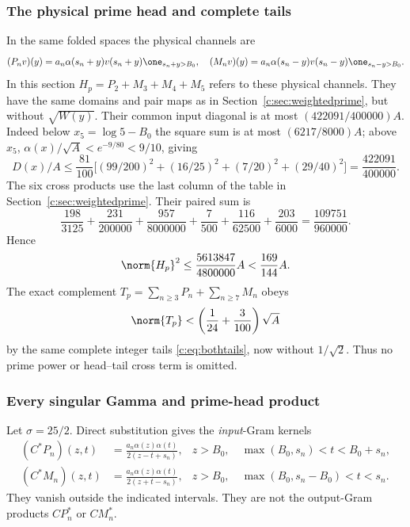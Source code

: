 \documentclass[11pt,a4paper]{article}
\numberwithin{equation}{section}
\theoremstyle{definition}\newtheorem{definition}[theorem]{Definition}
\theoremstyle{remark}\newtheorem{remark}[theorem]{Remark}
\begin{document}
\subsubsection{The physical prime head and complete tails}
In the same folded spaces the physical channels are
\[
 (P_nv)(y)=a_n\alpha(s_n+y)v(s_n+y)\one_{s_n+y>{B_0}},\quad
 (M_nv)(y)=a_n\alpha(s_n-y)v(s_n-y)\one_{s_n-y>{B_0}}.
\]
In this section $H_p=P_2+M_3+M_4+M_5$ refers to these physical channels.
They have the same domains and pair maps as in Section~\ref{c:sec:weightedprime}, but without $\sqrt{W(y)}$.
Their common input diagonal is at most $(422091/400000)A$.
Indeed below $x_5=\log5-{B_0}$ the square sum is at most $(6217/8000)A$;
above $x_5$, $\alpha(x)/\sqrt A<e^{-9/80}<9/10$, giving
\[
 D(x)/A\le\frac{81}{100}\bigl[(99/200)^2+(16/25)^2
 +(7/20)^2+(29/40)^2\bigr]=\frac{422091}{400000}.
\]
The six cross products use the last column of the table in Section~\ref{c:sec:weightedprime}.
Their paired sum is
\[
 \frac{198}{3125}+\frac{231}{200000}+\frac{957}{8000000}
 +\frac7{500}+\frac{116}{62500}+\frac{203}{6000}
 =\frac{109751}{960000}.
\]
Hence
\begin{equation}\label{c:eq:physicalhead}
 \norm{H_p}^2\le\frac{5613847}{4800000}A<\frac{169}{144}A.
\end{equation}
The exact complement $T_p=\sum_{n\ge3}P_n+\sum_{n\ge7}M_n$ obeys
\begin{equation}\label{c:eq:physicaltail}
 \norm{T_p}<\left(\frac1{24}+\frac3{100}\right)\sqrt A
\end{equation}
by the same complete integer tails \eqref{c:eq:bothtails}, now without $1/\sqrt2$.
Thus no prime power or head--tail cross term is omitted.

\subsubsection{Every singular Gamma and prime-head product}
Let $\sigma=25/2$. Direct substitution gives the \emph{input}-Gram kernels
\begin{align}
 (C^*P_n)(z,t)&=\frac{a_n\alpha(z)\alpha(t)}
                      {2(z-t+s_n)},&
 z>{B_0},\quad\max({B_0},s_n)<t<{B_0}+s_n,\label{c:eq:inputgramplus}\\
 (C^*M_n)(z,t)&=\frac{a_n\alpha(z)\alpha(t)}
                      {2(z+t-s_n)},&
 z>{B_0},\quad\max({B_0},s_n-{B_0})<t<s_n.\label{c:eq:inputgramminus}
\end{align}
They vanish outside the indicated intervals. They are not the output-Gram products $CP_n^*$ or $CM_n^*$.
\end{document}
